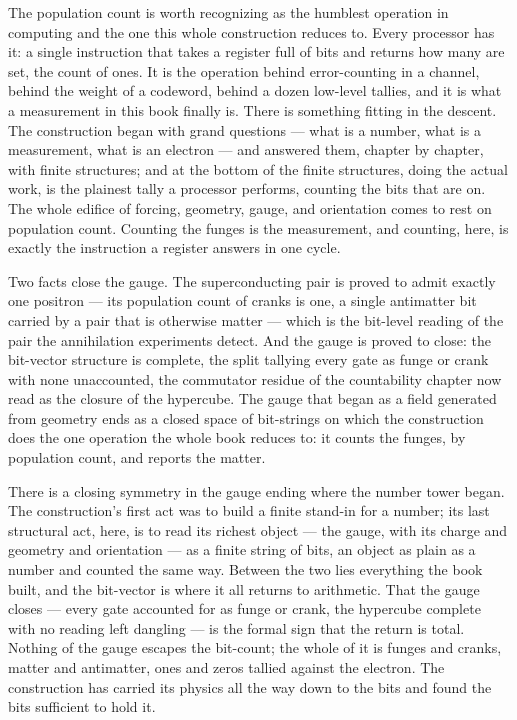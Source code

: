 The population count is worth recognizing as the humblest operation in computing and the one this whole
construction reduces to. Every processor has it: a single instruction that takes a register full of bits
and returns how many are set, the count of ones. It is the operation behind error-counting in a channel,
behind the weight of a codeword, behind a dozen low-level tallies, and it is what a measurement in this
book finally is. There is something fitting in the descent. The construction began with grand questions
--- what is a number, what is a measurement, what is an electron --- and answered them, chapter by chapter,
with finite structures; and at the bottom of the finite structures, doing the actual work, is the plainest
tally a processor performs, counting the bits that are on. The whole edifice of forcing, geometry, gauge,
and orientation comes to rest on population count. Counting the funges is the measurement, and counting,
here, is exactly the instruction a register answers in one cycle.

Two facts close the gauge. The superconducting pair is proved to admit exactly one positron --- its
population count of cranks is one, a single antimatter bit carried by a pair that is otherwise matter ---
which is the bit-level reading of the pair the annihilation experiments detect. And the gauge is proved to
close: the bit-vector structure is complete, the split tallying every gate as funge or crank with none
unaccounted, the commutator residue of the countability chapter now read as the closure of the hypercube.
The gauge that began as a field generated from geometry ends as a closed space of bit-strings on which the
construction does the one operation the whole book reduces to: it counts the funges, by population count,
and reports the matter.

There is a closing symmetry in the gauge ending where the number tower began. The construction's first act
was to build a finite stand-in for a number; its last structural act, here, is to read its richest object
--- the gauge, with its charge and geometry and orientation --- as a finite string of bits, an object as
plain as a number and counted the same way. Between the two lies everything the book built, and the
bit-vector is where it all returns to arithmetic. That the gauge closes --- every gate accounted for as
funge or crank, the hypercube complete with no reading left dangling --- is the formal sign that the return
is total. Nothing of the gauge escapes the bit-count; the whole of it is funges and cranks, matter and
antimatter, ones and zeros tallied against the electron. The construction has carried its physics all the
way down to the bits and found the bits sufficient to hold it.

